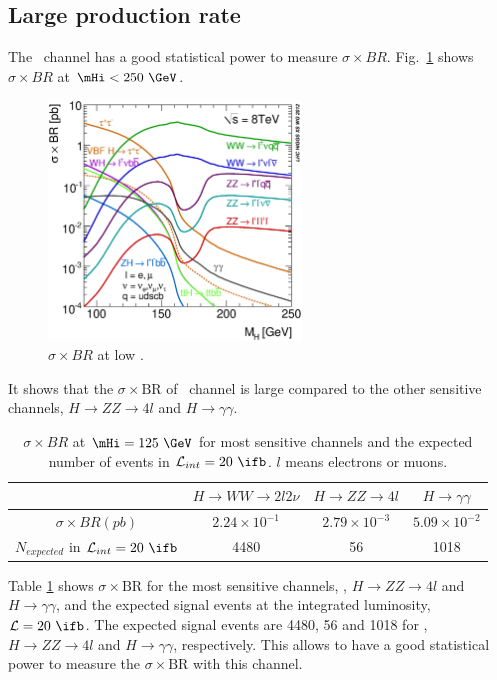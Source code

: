 %
\subsection{Large production rate}

The \hww\ channel has a good statistical power to measure $\sigma \times BR$.
Fig.~\ref{fig:XSBR_8TeV_SM_LM} shows $\sigma \times BR$ at $\mHi<250~\GeV$.
\begin{figure}[t]
\centering
\includegraphics[width=0.6\textwidth]{figures/XSBR_8TeV_SM_LM.eps}
\caption{$\sigma \times BR$ at low \mHi.}
\label{fig:XSBR_8TeV_SM_LM}
\end{figure}
It shows that the $\sigma \times \textrm{BR}$ of \hww\ channel 
is large compared to the other sensitive channels, $H \rightarrow ZZ\rightarrow 4l$
and $H \rightarrow\gamma\gamma$. 
\begin{table}[htb]
\centering
\begin{tabular}{c | c c c}
\hline 
        & $H \rightarrow WW \rightarrow 2l2\nu$   & $H \rightarrow ZZ\rightarrow 4l$ 
        & $H \rightarrow\gamma\gamma$  \\
\hline \hline 
$\sigma \times BR (pb)$  
        & $2.24\times10^{-1}$ &  $2.79\times10^{-3}$ & $5.09\times10^{-2}$ \\ 
$N_{expected}$ in $\mathcal{L}_{int} = 20~\ifb$ 
        & 4480 &  56 & 1018 \\ 
\hline 
\end{tabular}
\label{tab:XSBR_8TeV_SM_125}
\caption{$\sigma \times BR$ at $\mHi=125~\GeV$ for most sensitive channels 
and the expected number of events in $\mathcal{L}_{int} = 20~\ifb$.
$l$ means electrons or muons.}
\end{table}
Table \ref{tab:XSBR_8TeV_SM_125} shows $\sigma \times \textrm{BR}$ for 
the most sensitive channels, \hww, $H \rightarrow ZZ\rightarrow 4l$
and $H \rightarrow\gamma\gamma$, and the expected signal events at
the integrated luminosity, $\mathcal{L}=20~\ifb$. The expected signal 
events are 4480, 56 and 1018 for \hww, $H \rightarrow ZZ\rightarrow 4l$
and $H \rightarrow\gamma\gamma$, respectively. This allows to have a 
good statistical power to measure the $\sigma \times \textrm{BR}$
with this channel. 


